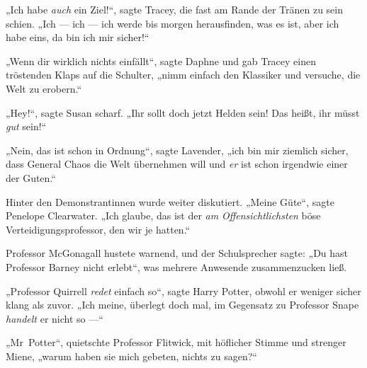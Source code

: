„Ich habe \emph{auch} ein Ziel!“, sagte Tracey, die fast am Rande der Tränen zu sein schien.
„Ich — ich — ich werde bis morgen herausfinden, was es ist, aber ich habe eins, da bin ich mir sicher!“

„Wenn dir wirklich nichts einfällt“, sagte Daphne und gab Tracey einen tröstenden Klaps auf die Schulter, „nimm einfach den Klassiker und versuche, die Welt zu erobern.“

„Hey!“, sagte Susan scharf.
„Ihr sollt doch jetzt Helden sein! Das heißt, ihr müsst \emph{gut} sein!“

„Nein, das ist schon in Ordnung“, sagte Lavender, „ich bin mir ziemlich sicher, dass General Chaos die Welt übernehmen will und \emph{er} ist schon irgendwie einer der Guten.“

Hinter den Demonstrantinnen wurde weiter diskutiert.
„Meine Güte“, sagte Penelope Clearwater.
„Ich glaube, das ist der \emph{am} \emph{Offensichtlichsten} böse Verteidigungsprofessor, den wir je hatten.“

Professor McGonagall hustete warnend, und der Schulsprecher sagte:
„Du hast Professor Barney nicht erlebt“, was mehrere Anwesende zusammenzucken ließ.

„Professor Quirrell \emph{redet} einfach so“, sagte Harry Potter, obwohl er weniger sicher klang als zuvor.
„Ich meine, überlegt doch mal, im Gegensatz zu Professor Snape \emph{handelt} er nicht so —“

„Mr~Potter“, quietschte Professor Flitwick, mit höflicher Stimme und strenger Miene, „warum haben sie mich gebeten, nichts zu sagen?“

